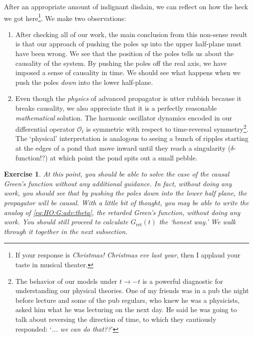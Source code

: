 \documentclass[
  11pt,
	colorful,
	raggedright,
]{tufte-style-thesis-flip}
\newtheorem{exercise}{Exercise}[section]
\begin{document}
After an appropriate amount of indignant disdain, we can reflect on how the heck we got here\footnote{If your response is \emph{Christmas! Christmas eve last year}, then I applaud your taste in musical theater.}. We make two observations:
\begin{enumerate}
\item After checking all of our work, the main conclusion from this non-sense result is that our approach of pushing the poles \emph{up} into the upper half-plane must have been wrong. We see that the position of the poles tells us about the causality of the system. By pushing the poles off the real axis, we have imposed a sense of causality in time. We should see what happens when we push the poles \emph{down} into the lower half-plane. 

\item Even though the \emph{physics} of advanced propagator is utter rubbish because it breaks causality, we also appreciate that it is a perfectly reasonable \emph{mathematical} solution. The harmonic oscillator dynamics encoded in our differential operator $\mathcal O_t$ is symmetric with respect to time-reversal symmetry\footnote{The behavior of our models under $t\to -t$ is a powerful diagnostic for understanding our physical theories. One of my friends was in a pub the night before lecture and some of the pub regulars, who knew he was a physicists, asked him what he was lecturing on the next day. He said he was going to talk about reversing the direction of time, to which they cautiously responded: `\emph{... we can do that??}'}. The `physical' interpretation is analogous to seeing a bunch of ripples starting at the edges of a pond that move inward until they reach a singularity ($\delta$-function!?) at which point the pond spits out a small pebble. 
\end{enumerate}


\begin{exercise}
At this point, you should be able to solve the case of the causal Green's function without any additional guidance. In fact, without doing any work, you should see that by pushing the poles down into the lower half plane, the propagator will be causal. With a little bit of thought, you may be able to write the analog of \eqref{eq:HO:G:adv:theta}, the retarded Green's function,
without doing any work. You should still proceed to calculate $G_\text{ret}(t)$ the `honest way.' We walk  through it together in the next subsection. 
\label{ex:retarded:G:HO}
\end{exercise}
\end{document}
